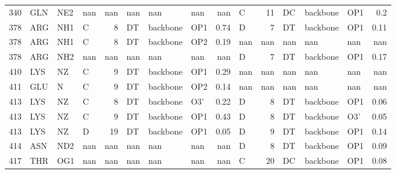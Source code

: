 \begin{longtable}{rlllrlllrlrlllr}
       340 & GLN        & NE2    & nan       &         nan & nan          & nan         & nan      &        nan    & C         &          11 & DC           & backbone    & OP1      &          0.2  \\
       378 & ARG        & NH1    & C         &           8 & DT           & backbone    & OP1      &          0.74 & D         &           7 & DT           & backbone    & OP1      &          0.11 \\
       378 & ARG        & NH1    & C         &           8 & DT           & backbone    & OP2      &          0.19 & nan       &         nan & nan          & nan         & nan      &        nan    \\
       378 & ARG        & NH2    & nan       &         nan & nan          & nan         & nan      &        nan    & D         &           7 & DT           & backbone    & OP1      &          0.17 \\
       410 & LYS        & NZ     & C         &           9 & DT           & backbone    & OP1      &          0.29 & nan       &         nan & nan          & nan         & nan      &        nan    \\
       411 & GLU        & N      & C         &           9 & DT           & backbone    & OP2      &          0.14 & nan       &         nan & nan          & nan         & nan      &        nan    \\
       413 & LYS        & NZ     & C         &           8 & DT           & backbone    & O3'      &          0.22 & D         &           8 & DT           & backbone    & OP1      &          0.06 \\
       413 & LYS        & NZ     & C         &           9 & DT           & backbone    & OP1      &          0.43 & D         &           8 & DT           & backbone    & O3'      &          0.05 \\
       413 & LYS        & NZ     & D         &          19 & DT           & backbone    & OP1      &          0.05 & D         &           9 & DT           & backbone    & OP1      &          0.14 \\
       414 & ASN        & ND2    & nan       &         nan & nan          & nan         & nan      &        nan    & D         &           8 & DT           & backbone    & OP1      &          0.09 \\
       417 & THR        & OG1    & nan       &         nan & nan          & nan         & nan      &        nan    & C         &          20 & DC           & backbone    & OP1      &          0.08 \\

\end{longtable}
